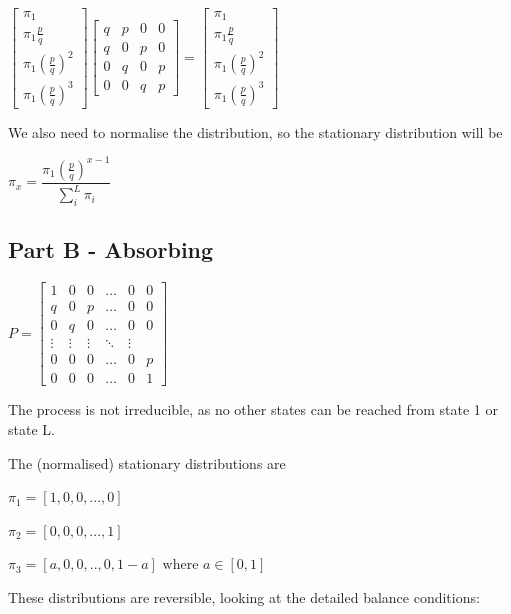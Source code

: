 \documentclass{article}
\begin{document}
 $\begin{bmatrix}
    \pi_1 \\
    \pi_1\frac{p}{q} \\
    \pi_1(\frac{p}{q})^2 \\
    \pi_1(\frac{p}{q})^3 
\end{bmatrix}
\begin{bmatrix}
    q & p & 0 & 0 \\
    q & 0 & p & 0\\
    0 & q & 0 & p\\
    0 & 0 & q & p
\end{bmatrix} = 
\begin{bmatrix}
    \pi_1 \\
    \pi_1\frac{p}{q} \\
    \pi_1(\frac{p}{q})^2 \\
    \pi_1(\frac{p}{q})^3 
\end{bmatrix}$

We also need to normalise the distribution, so the stationary distribution will be

$\pi_x = \dfrac{\pi_1 (\frac{p}{q})^{x-1}}{\sum_i^L{\pi_i}}$

\subsection{Part B - Absorbing}

$P = \begin{bmatrix}
    1 & 0 & 0 & \dots  & 0 & 0 \\
    q & 0 & p & \dots  & 0 & 0\\
    0 & q & 0 & \dots  & 0 & 0\\
    \vdots & \vdots & \vdots & \ddots & \vdots \\
    0 & 0 & 0 & \dots & 0 & p \\
    0 & 0 & 0 & \dots & 0 & 1
\end{bmatrix}$

The process is not irreducible, as no other states can be reached from state 1 or state L. 

The (normalised) stationary distributions are

$\pi_1 = [1,0,0,...,0]$

$\pi_2 = [0,0,0,...,1]$

$\pi_3 = [a,0,0,..,0,1-a] \text{ where } a \in [0,1]$



These distributions are reversible, looking at the detailed balance conditions:
\end{document}

